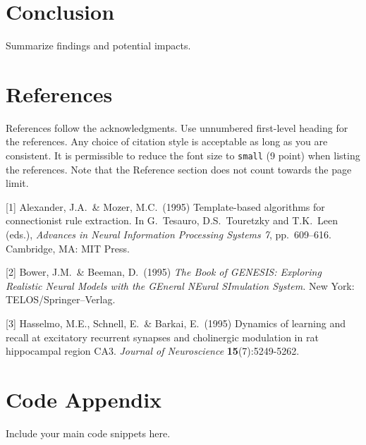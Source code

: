\documentclass{article}
\begin{document}
\section{Conclusion}
Summarize findings and potential impacts.


\section*{References}


References follow the acknowledgments. Use unnumbered first-level heading for
the references. Any choice of citation style is acceptable as long as you are
consistent. It is permissible to reduce the font size to \verb+small+ (9 point)
when listing the references.
Note that the Reference section does not count towards the page limit.
\medskip


{
\small


[1] Alexander, J.A.\ \& Mozer, M.C.\ (1995) Template-based algorithms for
connectionist rule extraction. In G.\ Tesauro, D.S.\ Touretzky and T.K.\ Leen
(eds.), {\it Advances in Neural Information Processing Systems 7},
pp.\ 609--616. Cambridge, MA: MIT Press.


[2] Bower, J.M.\ \& Beeman, D.\ (1995) {\it The Book of GENESIS: Exploring
  Realistic Neural Models with the GEneral NEural SImulation System.}  New York:
TELOS/Springer--Verlag.


[3] Hasselmo, M.E., Schnell, E.\ \& Barkai, E.\ (1995) Dynamics of learning and
recall at excitatory recurrent synapses and cholinergic modulation in rat
hippocampal region CA3. {\it Journal of Neuroscience} {\bf 15}(7):5249-5262.
}


\appendix
\section*{Code Appendix} %
Include your main code snippets here.
\end{document}
